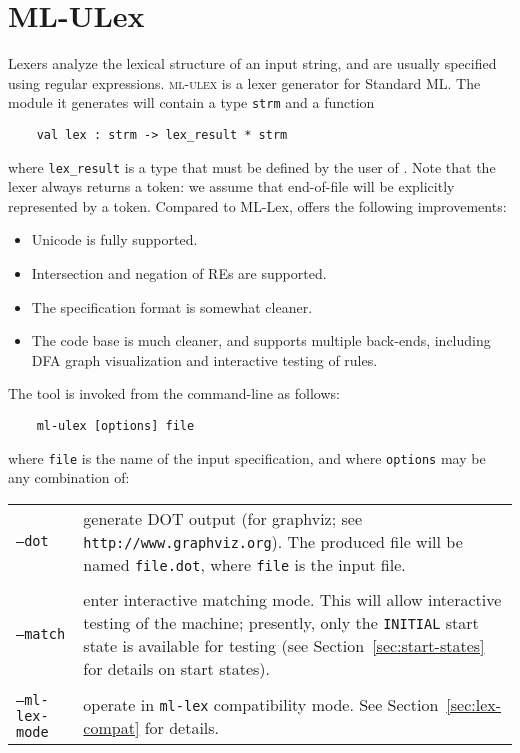 \chapter{ML-ULex}


Lexers analyze the lexical structure of an input string, and are usually specified using regular expressions.  \textsc{ml-ulex} is a lexer generator for Standard ML.  The module it generates will contain a type {\tt strm} and a function
\begin{verbatim}
    val lex : strm -> lex_result * strm
\end{verbatim}
where {\tt lex\_result} is a type that must be defined by the user of \ulex{}.  Note that the lexer always returns a token: we assume that end-of-file will be explicitly represented by a token.  Compared to ML-Lex, \ulex{} offers the following improvements:
\begin{itemize}
 \item Unicode is fully supported.
 \item Intersection and negation of REs are supported.
 \item The specification format is somewhat cleaner.
 \item The code base is much cleaner, and supports multiple back-ends, including DFA graph visualization and interactive testing of rules.
\end{itemize}
The tool is invoked from the command-line as follows:
\begin{verbatim}
    ml-ulex [options] file
\end{verbatim}
where {\tt file} is the name of the input \ulex{} specification, and where {\tt options} may be any combination of:

\vskip 12pt
\begin{tabular}{lp{}}
  {\tt --dot} & generate DOT output (for graphviz; see \texttt{http://www.graphviz.org}).  The produced file will be named {\tt file.dot}, where {\tt file} is the input file. \\
  \\
  {\tt --match} & enter interactive matching mode.  This will allow interactive testing of the machine; presently, only the {\tt INITIAL} start state is available for testing (see Section~\ref{sec:start-states} for details on start states).  \\
  \\
  {\tt --ml-lex-mode} & operate in {\tt ml-lex} compatibility mode.  See Section~\ref{sec:lex-compat} for details.
\end{tabular}

